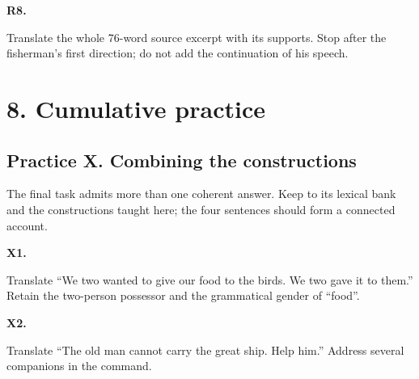 \par\begin{minipage}{\linewidth}\raggedright
\textbf{R8.}

Translate the whole 76-word source excerpt with its supports. Stop after the fisherman’s first direction; do not add the continuation of his speech.

\end{minipage}\par\addvspace{4pt}

\section*{8. Cumulative practice}

\subsection*{Practice X. Combining the constructions}

The final task admits more than one coherent answer. Keep to its lexical bank and the constructions taught here; the four sentences should form a connected account.

\par\begin{minipage}{\linewidth}\raggedright
\textbf{X1.}

Translate “We two wanted to give our food to the birds. We two gave it to them.” Retain the two-person possessor and the grammatical gender of “food”.

\end{minipage}\par\addvspace{4pt}

\par\begin{minipage}{\linewidth}\raggedright
\textbf{X2.}

Translate “The old man cannot carry the great ship. Help him.” Address several companions in the command.

\end{minipage}\par\addvspace{4pt}

